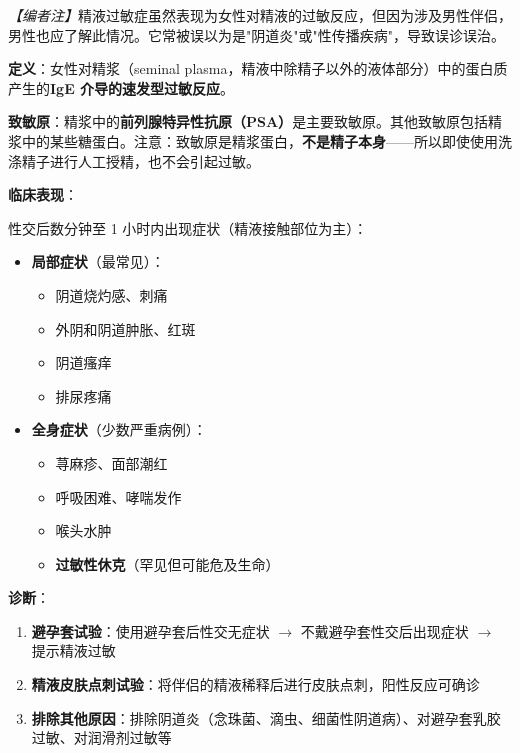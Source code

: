 \documentclass[12pt,a4paper,twoside]{ctexbook}
\begin{document}
\noindent\textit{【编者注】}精液过敏症虽然表现为女性对精液的过敏反应，但因为涉及男性伴侣，男性也应了解此情况。它常被误以为是"阴道炎"或"性传播疾病"，导致误诊误治。

\vspace{0.5em}
\noindent\textbf{定义}：女性对精浆（seminal plasma，精液中除精子以外的液体部分）中的蛋白质产生的\textbf{IgE 介导的速发型过敏反应}。

\vspace{0.5em}
\noindent\textbf{致敏原}：精浆中的\textbf{前列腺特异性抗原（PSA）}是主要致敏原。其他致敏原包括精浆中的某些糖蛋白。注意：致敏原是精浆蛋白，\textbf{不是精子本身}——所以即使使用洗涤精子进行人工授精，也不会引起过敏。

\vspace{0.5em}
\noindent\textbf{临床表现}：

性交后数分钟至 1 小时内出现症状（精液接触部位为主）：
\begin{itemize}[leftmargin=2cm]
	\item \textbf{局部症状}（最常见）：
	\begin{itemize}
		\item 阴道烧灼感、刺痛
		\item 外阴和阴道肿胀、红斑
		\item 阴道瘙痒
		\item 排尿疼痛
	\end{itemize}
	\item \textbf{全身症状}（少数严重病例）：
	\begin{itemize}
		\item 荨麻疹、面部潮红
		\item 呼吸困难、哮喘发作
		\item 喉头水肿
		\item \textbf{过敏性休克}（罕见但可能危及生命）
	\end{itemize}
\end{itemize}

\vspace{0.5em}
\noindent\textbf{诊断}：
\begin{enumerate}
	\item \textbf{避孕套试验}：使用避孕套后性交无症状 $\rightarrow$ 不戴避孕套性交后出现症状 $\rightarrow$ 提示精液过敏
	\item \textbf{精液皮肤点刺试验}：将伴侣的精液稀释后进行皮肤点刺，阳性反应可确诊
	\item \textbf{排除其他原因}：排除阴道炎（念珠菌、滴虫、细菌性阴道病）、对避孕套乳胶过敏、对润滑剂过敏等
\end{enumerate}
\end{document}
